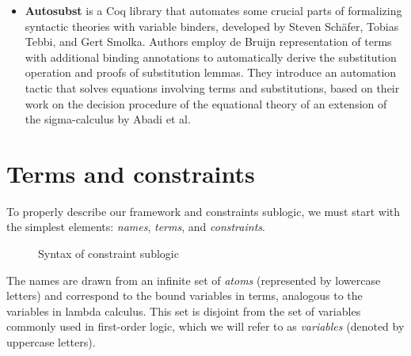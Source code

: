 \documentclass[english, mgr]{iithesis}
\renewcommand{\it}[1]{\textit{#1}}
\begin{document}
\begin{itemize}
\item \textbf{Autosubst}\cite{autosubst}
is a Coq library that automates some crucial parts of formalizing syntactic theories with variable binders,
developed by Steven Schäfer, Tobias Tebbi, and Gert Smolka.
Authors employ de Bruijn representation of terms with additional binding annotations
to automatically derive the substitution operation and proofs of substitution lemmas.
They introduce an automation tactic that solves equations involving terms and substitutions,
based on their work on the decision procedure of the equational theory of
an extension of the sigma-calculus by Abadi et al\cite{sigma-calculus}.
\\

\end{itemize}
\chapter{Terms and constraints}
To properly describe our framework and constraints sublogic,
we must start with the simplest elements: \it{names}, \it{terms}, and \it{constraints}.

\begin{figure}[htbp]
  \centering
  \caption{Syntax of constraint sublogic}
  \label{fig:terms-constraints-syntax}
\end{figure}
The names are drawn from an infinite set of \it{atoms} (represented by lowercase letters)
and correspond to the bound variables in terms, analogous to the variables in lambda calculus.
This set is disjoint from the set of variables commonly used in first-order logic,
which we will refer to as \it{variables} (denoted by uppercase letters).
\end{document}
